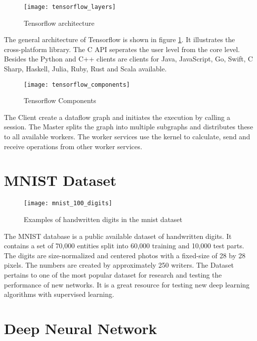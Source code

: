 \begin{figure}[H]
    \centering
    \texttt{[image: tensorflow\_layers]}
    \caption{\cite{tensorflow_layers_image} Tensorflow architecture}
    \label{fig:tensorflow_layers}
\end{figure}
The general architecture of Tensorflow is shown in figure \ref{fig:tensorflow_layers}.
It illustrates the cross-platform library.
The C API seperates the user level from the core level.
Besides the Python and C++ clients are clients for Java, JavaScript, Go, Swift, C Sharp, Haskell, Julia, Ruby, Rust and Scala available.
\cite{tensorflow-architecture}

\begin{figure}[H]
    \centering
    \texttt{[image: tensorflow\_components]}
    \caption{\cite{tensorflow_components_image} Tensorflow Components}
    \label{fig:tensorflow_components}
\end{figure}

The Client create a dataflow graph and initiates the execution by calling a session.
The Master splits the graph into multiple subgraphs and distributes these to all available workers.
The worker services use the kernel to calculate, send and receive operations from other worker services.
\cite{tensorflow-architecture}

\section{MNIST Dataset}

\begin{figure}[H]
    \centering
    \texttt{[image: mnist\_100\_digits]}
    \caption{\cite{mnist_examples_image} Examples of handwritten digits in the mnist dataset}
    \label{fig:mnist_examples}
\end{figure}

The MNIST database is a public available dataset of handwritten digits.
It contains a set of 70,000 entities split into 60,000 training and 10,000 test parts.
The digits are size-normalized and centered photos with a fixed-size of 28 by 28 pixels.
The numbers are created by approximately 250 writers. 
\cite{mnist-database}
The Dataset pertains to one of the most popular dataset for research and testing the performance of new networks.
It is a great resource for testing new deep learning algorithms with supervised learning.

\section{Deep Neural Network}


